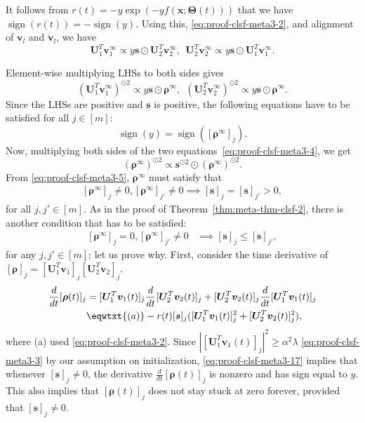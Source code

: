 \documentclass{article} %
\def\vs{{\bm{s}}}
\def\vv{{\bm{v}}}
\def\vx{{\bm{x}}}
\def\mU{{\bm{U}}}
\DeclareMathOperator{\sign}{sign}
\newcommand{\bTheta}{\bm{\Theta}}
\newcommand{\vrho}{{\bm{\rho}}}
\begin{document}
It follows from $r(t) = -y \exp(-y f(\vx;\bTheta(t)))$ that we have $\sign(r(t)) = -\sign(y)$. Using this, \eqref{eq:proof-clsf-meta3-2}, and alignment of $\vv_l$ and $\dot \vv_l$, we have
\begin{equation}
\label{eq:proof-clsf-meta3-14}
    \mU_{1}^T \vv_1^\infty \propto y \vs \odot \mU_2^T \vv_2^\infty,~~
    \mU_{2}^T \vv_2^\infty \propto y \vs \odot \mU_1^T \vv_1^\infty.
\end{equation}

Element-wise multiplying LHSs to both sides gives
\begin{equation}
\label{eq:proof-clsf-meta3-4}
    (\mU_{1}^T \vv_1^\infty)^{\odot 2} \propto y\vs \odot \vrho^\infty,~~
    (\mU_{2}^T \vv_2^\infty)^{\odot 2} \propto y\vs \odot \vrho^\infty.
\end{equation}
Since the LHSs are positive and $\vs$ is positive, the following equations have to be satisfied for all $j \in [m]$:
\begin{equation}
\label{eq:proof-clsf-meta3-16}
    \sign(y) = \sign([\vrho^\infty]_j).
\end{equation}
Now, multiplying both sides of the two equations~\eqref{eq:proof-clsf-meta3-4}, we get
\begin{equation}
\label{eq:proof-clsf-meta3-5}
    (\vrho^{\infty})^{\odot 2} \propto \vs^{\odot 2} \odot (\vrho^\infty)^{\odot 2}.
\end{equation}
From \eqref{eq:proof-clsf-meta3-5}, $\vrho^\infty$ must satisfy that
\begin{align}
\label{eq:proof-clsf-meta3-6}
[\vrho^\infty]_j \neq 0, [\vrho^\infty]_{j'} \neq 0 \implies [\vs]_j = [\vs]_{j'} > 0,
\end{align}
for all $j, j' \in [m]$.
As in the proof of Theorem~\ref{thm:meta-thm-clsf-2}, there is another condition that has to be satisfied:
\begin{align}
\label{eq:proof-clsf-meta3-7}
[\vrho^\infty]_j = 0, [\vrho^\infty]_{j'} \neq 0 &\implies
[\vs]_j \leq [\vs]_{j'},
\end{align}
for any $j, j'\in [m]$; let us prove why. 
First, consider the time derivative of $[\vrho]_j = [\mU_1^T \vv_1]_j [\mU_2^T \vv_2]_j$.
\begin{align}
	\frac{d}{dt} [\vrho(t)]_j
	&=[\mU_1^T \vv_1(t)]_j \frac{d}{dt} [\mU_2^T \vv_2(t)]_j
	+ [\mU_2^T \vv_2(t)]_j \frac{d}{dt} [\mU_1^T \vv_1(t)]_j\notag\\
	&\eqwtxt{(a)}
	-r(t) [\vs]_j ([\mU_1^T \vv_1(t)]_j^2 + [\mU_2^T \vv_2(t)]_j^2),\label{eq:proof-clsf-meta3-17}
\end{align}
where (a) used \eqref{eq:proof-clsf-meta3-2}.
Since $|[\mU_1^T \vv_1(t)]_j|^2 \geq \alpha^2 \lambda$ \eqref{eq:proof-clsf-meta3-3} by our assumption on initialization, \eqref{eq:proof-clsf-meta3-17} implies that whenever $[\vs]_j \neq 0$, the derivative $\frac{d}{dt} [\vrho(t)]_j$ is nonzero and has sign equal to $y$. This also implies that $[\vrho(t)]_j$ does not stay stuck at zero forever, provided that $[\vs]_j \neq 0$. 
\end{document}
